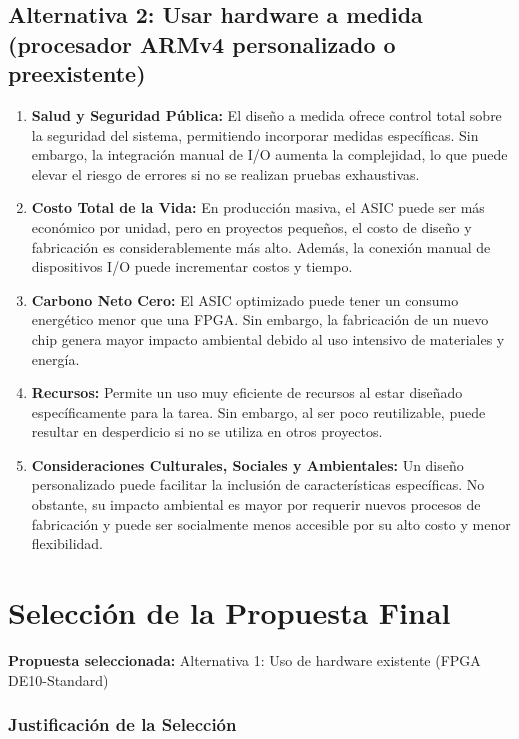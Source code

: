 \documentclass[conference]{IEEEtran}
\begin{document}
\subsection{Alternativa 2: Usar hardware a medida (procesador ARMv4 personalizado o preexistente)}

\begin{enumerate}
	\item \textbf{Salud y Seguridad Pública:} El diseño a medida ofrece control total sobre la seguridad del sistema, permitiendo incorporar medidas específicas. Sin embargo, la integración manual de I/O aumenta la complejidad, lo que puede elevar el riesgo de errores si no se realizan pruebas exhaustivas.
	
	\item \textbf{Costo Total de la Vida:} En producción masiva, el ASIC puede ser más económico por unidad, pero en proyectos pequeños, el costo de diseño y fabricación es considerablemente más alto. Además, la conexión manual de dispositivos I/O puede incrementar costos y tiempo.
	
	\item \textbf{Carbono Neto Cero:} El ASIC optimizado puede tener un consumo energético menor que una FPGA. Sin embargo, la fabricación de un nuevo chip genera mayor impacto ambiental debido al uso intensivo de materiales y energía.
	
	\item \textbf{Recursos:} Permite un uso muy eficiente de recursos al estar diseñado específicamente para la tarea. Sin embargo, al ser poco reutilizable, puede resultar en desperdicio si no se utiliza en otros proyectos.
	
	\item \textbf{Consideraciones Culturales, Sociales y Ambientales:} Un diseño personalizado puede facilitar la inclusión de características específicas. No obstante, su impacto ambiental es mayor por requerir nuevos procesos de fabricación y puede ser socialmente menos accesible por su alto costo y menor flexibilidad.
\end{enumerate}


\section{Selección de la Propuesta Final}

\textbf{Propuesta seleccionada:} Alternativa 1: Uso de hardware existente (FPGA DE10-Standard)

\subsubsection*{Justificación de la Selección}
\end{document}
